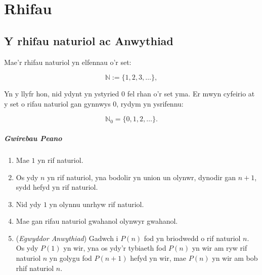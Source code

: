 \chapter{Rhifau}

\section{Y rhifau naturiol ac Anwythiad}

Mae'r rhifau naturiol yn elfennau o'r set:

\begin{equation}
  \mathbb{N} := \{1, 2, 3, \ldots\},
\end{equation}

Yn y llyfr hon, nid ydynt yn ystyried $0$ fel rhan o'r set yma. Er
mwyn cyfeirio at y set o rifau naturiol gan gynnwys $0$, rydym yn
ysrifennu:

\begin{equation}
  \mathbb{N}_0 = \{0, 1, 2, \ldots \}.
\end{equation}


\paragraph{Gwirebau Peano}
\begin{enumerate}
\item Mae $1$ yn rif naturiol.
\item Os ydy $n$ yn rif naturiol, yna bodolir yn union un olynwr,
  dynodir gan $n+1$, sydd hefyd yn rif naturiol.
\item Nid ydy $1$ yn olynnu unrhyw rif naturiol.
\item Mae gan rifau naturiol gwahanol olynwyr gwahanol.
\item (\textit{Egwyddor Anwythiad}) Gadwch i $P(n)$ fod yn briodwedd o
  rif naturiol $n$. Os ydy $P(1)$ yn wir, yna os ydy'r tybiaeth fod
  $P(n)$ yn wir am ryw rif naturiol $n$ yn golygu fod $P(n+1)$ hefyd
  yn wir, mae $P(n)$ yn wir am bob rhif naturiol $n$.
\end{enumerate}